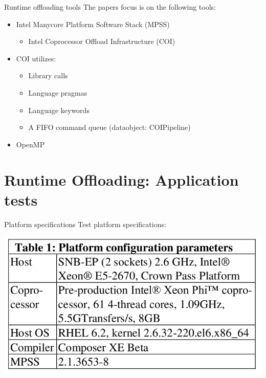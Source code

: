 \documentclass[screen]{beamer}
\begin{document}
\begin{frame}{Runtime offloading tools}
    The papers focus is on the following tools:
    \begin{itemize}[<+-| alert@+>]
        \item Intel Manycore Platform Software Stack (MPSS)
        \begin{itemize}
            \item Intel Coprocessor Offload Infrastructure (COI)
        \end{itemize}
        \item COI utilizes:
        \begin{itemize}[<+-| alert@+>]
            \item Library calls
            \item Language pragmas
            \item Language keywords
            \item A FIFO command queue (dataobject: COIPipeline)
        \end{itemize}
        \item OpenMP
    \end{itemize}
\end{frame}

\section{Runtime Offloading: Application tests}

\begin{frame}{Platform specifications}
    Test platform specifications:
    \begin{center}
        \includegraphics[width=0.8\linewidth]{table1.png}
    \end{center}
\end{frame}
\end{document}
